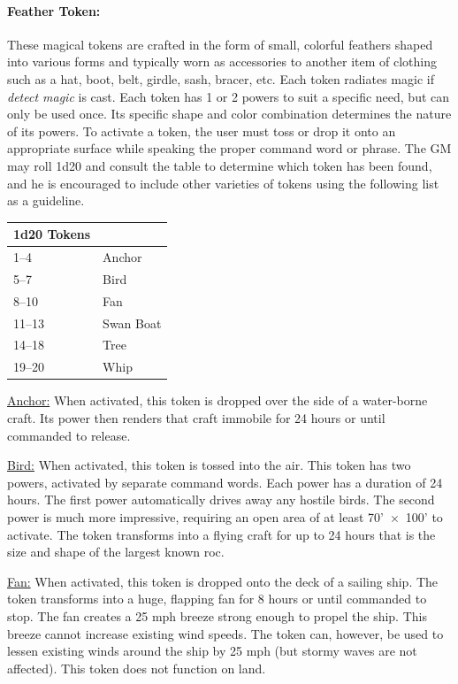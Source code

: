 \begin{multicols}{2}
\paragraph{Feather Token:} These magical tokens are crafted in the form of small, colorful feathers shaped into various forms and typically worn as accessories to another item of clothing such as a hat, boot, belt, girdle, sash, bracer, etc.  Each token radiates magic if \textit{detect magic} is cast.  Each token has 1 or 2 powers to suit a specific need, but can only be used once.  Its specific shape and color combination determines the nature of its powers.  To activate a token, the user must toss or drop it onto an appropriate surface while speaking the proper command word or phrase.  The GM may roll 1d20 and consult the table to determine which token has been found, and he is encouraged to include other varieties of tokens using the following list as a guideline.

\noindent \begin{tabular}{|p{}|p{}|}
\hline
1d20	Tokens \\
\hline\hline
\rowcolor[gray]{.9}1--4	& Anchor \\
5--7	& Bird \\
\rowcolor[gray]{.9}8--10	& Fan \\
11--13	& Swan Boat \\
\rowcolor[gray]{.9}14--18	& Tree \\
19--20	& Whip \\
\hline
\end{tabular}

\underline{Anchor:} When activated, this token is dropped over the side of a water-borne craft.  Its power then renders that craft immobile for 24 hours or until commanded to release.

\underline{Bird:} When activated, this token is tossed into the air.  This token has two powers, activated by separate command words.  Each power has a duration of 24 hours.  The first power automatically drives away any hostile birds.  The second power is much more impressive, requiring an open area of at least 70'~$\times$~100' to activate.  The token transforms into a flying craft for up to 24 hours that is the size and shape of the largest known roc.

\underline{Fan:} When activated, this token is dropped onto the deck of a sailing ship.  The token transforms into a huge, flapping fan for 8 hours or until commanded to stop.  The fan creates a 25 mph breeze strong enough to propel the ship.  This breeze cannot increase existing wind speeds.  The token can, however, be used to lessen existing winds around the ship by 25 mph (but stormy waves are not affected).  This token does not function on land.


\end{multicols}
